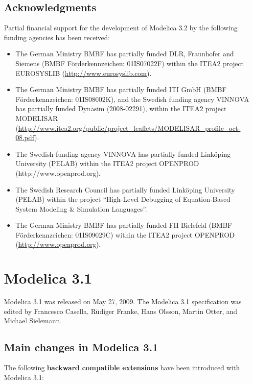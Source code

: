 \documentclass[10pt,a4paper]{report}
\def\doublelabel#1{\label{#1}}
\begin{document}
\subsection{Acknowledgments}\doublelabel{acknowledgments2}

Partial financial support for the development of Modelica 3.2 by the
following funding agencies has been received:

\begin{itemize}
\item
  The German Ministry BMBF has partially funded DLR, Fraunhofer and
  Siemens (BMBF Förderkennzeichen: 01IS07022F) within the ITEA2 project
  EUROSYSLIB (\url{http://www.eurosyslib.com}).
\item
  The German Ministry BMBF has partially funded ITI GmbH (BMBF
  Förderkennzeichen: 01IS08002K), and the Swedish funding agency VINNOVA
  has partially funded Dynasim (2008-02291), within the ITEA2 project
  MODELISAR
  (\url{http://www.itea2.org/public/project_leaflets/MODELISAR_profile_oct-08.pdf}).
\item
  The Swedish funding agency VINNOVA has partially funded Linköping
  University (PELAB) within the ITEA2 project OPENPROD
  (http://www.openprod.org).
\item
  The Swedish Research Council has partially funded Linköping University
  (PELAB) within the project ``High-Level Debugging of Equation-Based
  System Modeling \& Simulation Languages''.
\item
  The German Ministry BMBF has partially funded FH Bielefeld (BMBF
  Förderkennzeichen: 01IS09029C) within the ITEA2 project OPENPROD
  (\href{http://www.openprod.}{http://www.openprod.org}).
\end{itemize}

\section{Modelica 3.1}\doublelabel{modelica-3-1}

Modelica 3.1 was released on May 27, 2009. The Modelica 3.1
specification was edited by Francesco Casella, Rüdiger Franke, Hans
Olsson, Martin Otter, and Michael Sielemann.

\subsection{Main changes in Modelica 3.1}\doublelabel{main-changes-in-modelica-3-1}

The following \textbf{backward compatible extensions} have been
introduced with Modelica 3.1:
\end{document}
